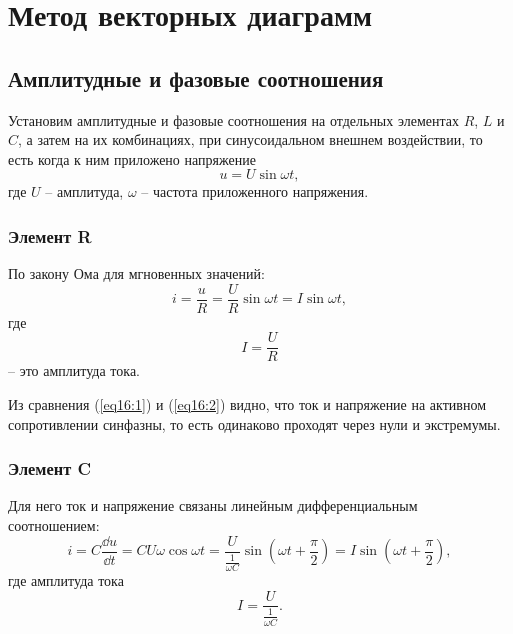\chapter{Метод векторных диаграмм}

\section{Амплитудные и фазовые соотношения}

	Установим амплитудные и фазовые соотношения на отдельных элементах \( R \),
    \( L \) и \( C \), а затем на их комбинациях, при синусоидальном внешнем
    воздействии, то есть когда к ним приложено напряжение
	\begin{equation}
		u = U\sin\omega t, \label{eq16:1}
	\end{equation}
	где \( U \) -- амплитуда, \( \omega \) -- частота приложенного напряжения.
	
	\subsection{Элемент R}
	
        По закону Ома для мгновенных значений:
        \begin{equation}
            i = \frac{u}{R} = \frac{U}{R}\sin\omega t = I\sin\omega t,
            \label{eq16:2}
        \end{equation}
        где
        \begin{equation}
            I = \frac{U}{R}
            \label{eq16:3}
        \end{equation}
        -- это амплитуда тока.
        
        Из сравнения (\ref{eq16:1}) и (\ref{eq16:2}) видно, что ток и напряжение
        на активном сопротивлении синфазны, то есть одинаково проходят через
        нули и экстремумы.
        
    \subsection{Элемент C}
        Для него ток и напряжение связаны линейным дифференциальным
        соотношением:
        \begin{equation}
            i = C\frac{\dd u}{\dd t} = CU\omega\cos\omega t =
            \frac{U}{\frac{1}{\omega C}}\sin\left(\omega t +
            \frac{\pi}{2}\right) =  I\sin\left(\omega t + \frac{\pi}{2}\right),
            \label{eq16:4}
        \end{equation}
        где амплитуда тока
        \begin{equation}
            I = \frac{U}{\frac{1}{\omega C}}.
            \label{eq16:5}
        \end{equation}
        
